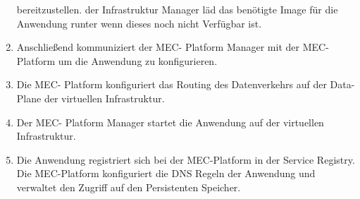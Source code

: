 \documentclass[runningheads]{llncs}
\numberwithin{figure}{section}
\begin{document}
\begin{enumerate}
  bereitzustellen. der Infrastruktur Manager läd das benötigte Image für die Anwendung runter wenn dieses noch nicht Verfügbar ist.
  \item Anschließend kommuniziert der MEC- Platform Manager mit der MEC- Platform um die Anwendung zu konfigurieren.
  \item Die MEC- Platform konfiguriert das Routing des Datenverkehrs  auf der Data-Plane der virtuellen Infrastruktur.
  \item Der MEC- Platform Manager startet die Anwendung auf der virtuellen Infrastruktur.
  \item Die Anwendung registriert sich bei der MEC-Platform in der Service Registry. Die MEC-Platform konfiguriert die DNS Regeln der 
  Anwendung und verwaltet den Zugriff auf den Persistenten Speicher.
\end{enumerate}

\newpage
\end{document}
